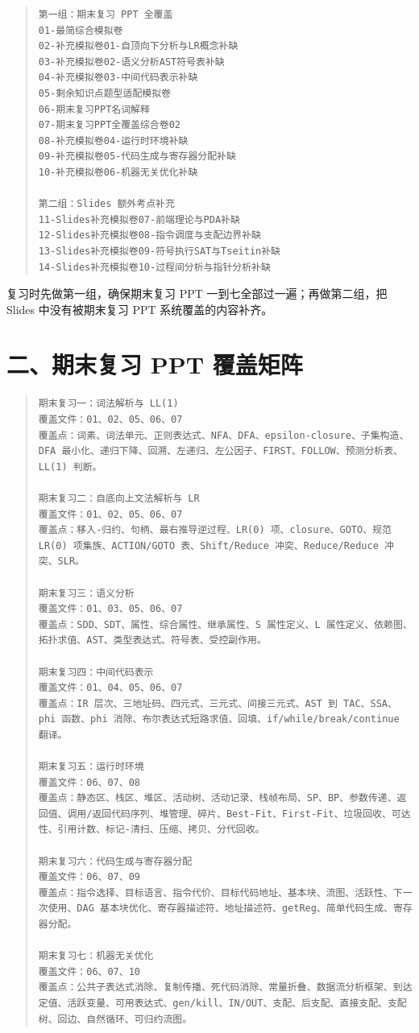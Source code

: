 \documentclass[UTF8,zihao=-4]{ctexart}
\begin{document}
\begin{quote}
\footnotesize
\begin{verbatim}
第一组：期末复习 PPT 全覆盖
01-最简综合模拟卷
02-补充模拟卷01-自顶向下分析与LR概念补缺
03-补充模拟卷02-语义分析AST符号表补缺
04-补充模拟卷03-中间代码表示补缺
05-剩余知识点题型适配模拟卷
06-期末复习PPT名词解释
07-期末复习PPT全覆盖综合卷02
08-补充模拟卷04-运行时环境补缺
09-补充模拟卷05-代码生成与寄存器分配补缺
10-补充模拟卷06-机器无关优化补缺

第二组：Slides 额外考点补充
11-Slides补充模拟卷07-前端理论与PDA补缺
12-Slides补充模拟卷08-指令调度与支配边界补缺
13-Slides补充模拟卷09-符号执行SAT与Tseitin补缺
14-Slides补充模拟卷10-过程间分析与指针分析补缺
\end{verbatim}
\end{quote}

复习时先做第一组，确保期末复习 PPT 一到七全部过一遍；再做第二组，把 Slides 中没有被期末复习 PPT 系统覆盖的内容补齐。

\section*{二、期末复习 PPT 覆盖矩阵}


\begin{quote}
\footnotesize
\begin{verbatim}
期末复习一：词法解析与 LL(1)
覆盖文件：01、02、05、06、07
覆盖点：词素、词法单元、正则表达式、NFA、DFA、epsilon-closure、子集构造、DFA 最小化、递归下降、回溯、左递归、左公因子、FIRST、FOLLOW、预测分析表、LL(1) 判断。

期末复习二：自底向上文法解析与 LR
覆盖文件：01、02、05、06、07
覆盖点：移入-归约、句柄、最右推导逆过程、LR(0) 项、closure、GOTO、规范 LR(0) 项集族、ACTION/GOTO 表、Shift/Reduce 冲突、Reduce/Reduce 冲突、SLR。

期末复习三：语义分析
覆盖文件：01、03、05、06、07
覆盖点：SDD、SDT、属性、综合属性、继承属性、S 属性定义、L 属性定义、依赖图、拓扑求值、AST、类型表达式、符号表、受控副作用。

期末复习四：中间代码表示
覆盖文件：01、04、05、06、07
覆盖点：IR 层次、三地址码、四元式、三元式、间接三元式、AST 到 TAC、SSA、phi 函数、phi 消除、布尔表达式短路求值、回填、if/while/break/continue 翻译。

期末复习五：运行时环境
覆盖文件：06、07、08
覆盖点：静态区、栈区、堆区、活动树、活动记录、栈帧布局、SP、BP、参数传递、返回值、调用/返回代码序列、堆管理、碎片、Best-Fit、First-Fit、垃圾回收、可达性、引用计数、标记-清扫、压缩、拷贝、分代回收。

期末复习六：代码生成与寄存器分配
覆盖文件：06、07、09
覆盖点：指令选择、目标语言、指令代价、目标代码地址、基本块、流图、活跃性、下一次使用、DAG 基本块优化、寄存器描述符、地址描述符、getReg、简单代码生成、寄存器分配。

期末复习七：机器无关优化
覆盖文件：06、07、10
覆盖点：公共子表达式消除、复制传播、死代码消除、常量折叠、数据流分析框架、到达定值、活跃变量、可用表达式、gen/kill、IN/OUT、支配、后支配、直接支配、支配树、回边、自然循环、可归约流图。
\end{verbatim}
\end{quote}
\end{document}
